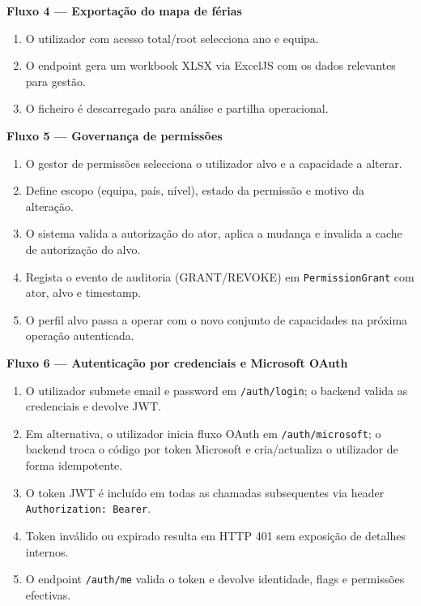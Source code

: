 \documentclass[11pt,a4paper,twoside]{article}
\begin{document}
\textbf{Fluxo 4 — Exportação do mapa de férias}
\begin{enumerate}
  \item O utilizador com acesso total/root selecciona ano e equipa.
  \item O endpoint gera um workbook XLSX via ExcelJS com os dados relevantes para gestão.
  \item O ficheiro é descarregado para análise e partilha operacional.
\end{enumerate}

\textbf{Fluxo 5 — Governança de permissões}
\begin{enumerate}
  \item O gestor de permissões selecciona o utilizador alvo e a capacidade a alterar.
  \item Define escopo (equipa, país, nível), estado da permissão e motivo da alteração.
  \item O sistema valida a autorização do ator, aplica a mudança e invalida a cache de autorização do alvo.
  \item Regista o evento de auditoria (GRANT/REVOKE) em \texttt{PermissionGrant} com ator, alvo e timestamp.
  \item O perfil alvo passa a operar com o novo conjunto de capacidades na próxima operação autenticada.
\end{enumerate}

\textbf{Fluxo 6 — Autenticação por credenciais e Microsoft OAuth}
\begin{enumerate}
  \item O utilizador submete email e password em \texttt{/auth/login}; o backend valida as credenciais e devolve JWT.
  \item Em alternativa, o utilizador inicia fluxo OAuth em \texttt{/auth/microsoft}; o backend troca o código por token Microsoft e cria/actualiza o utilizador de forma idempotente.
  \item O token JWT é incluído em todas as chamadas subsequentes via header \texttt{Authorization: Bearer}.
  \item Token inválido ou expirado resulta em HTTP 401 sem exposição de detalhes internos.
  \item O endpoint \texttt{/auth/me} valida o token e devolve identidade, flags e permissões efectivas.
\end{enumerate}
\end{document}
